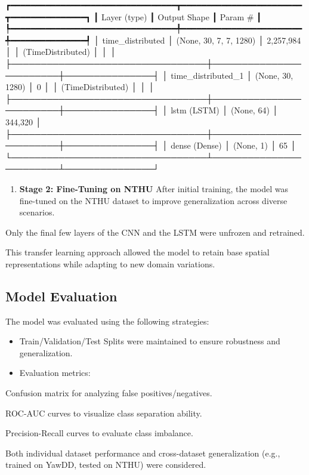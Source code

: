 \documentclass[
  letterpaper,
  DIV=11,
  numbers=noendperiod]{scrreport}
\providecommand{\tightlist}{%
  \setlength{\itemsep}{0pt}\setlength{\parskip}{0pt}}
\begin{document}
┏━━━━━━━━━━━━━━━━━━━━━━━━━━━━━━━━━┳━━━━━━━━━━━━━━━━━━━━━━━━┳━━━━━━━━━━━━━━━┓
┃ Layer (type) ┃ Output Shape ┃ Param \# ┃
┡━━━━━━━━━━━━━━━━━━━━━━━━━━━━━━━━━╇━━━━━━━━━━━━━━━━━━━━━━━━╇━━━━━━━━━━━━━━━┩
│ time\_distributed │ (None, 30, 7, 7, 1280) │ 2,257,984 │ │
(TimeDistributed) │ │ │
├─────────────────────────────────┼────────────────────────┼───────────────┤
│ time\_distributed\_1 │ (None, 30, 1280) │ 0 │ │ (TimeDistributed) │ │
│
├─────────────────────────────────┼────────────────────────┼───────────────┤
│ lstm (LSTM) │ (None, 64) │ 344,320 │
├─────────────────────────────────┼────────────────────────┼───────────────┤
│ dense (Dense) │ (None, 1) │ 65 │
└─────────────────────────────────┴────────────────────────┴───────────────┘

\begin{enumerate}
\def\labelenumi{\arabic{enumi}.}
\setcounter{enumi}{1}
\tightlist
\item
  \textbf{Stage 2: Fine-Tuning on NTHU} After initial training, the
  model was fine-tuned on the NTHU dataset to improve generalization
  across diverse scenarios.
\end{enumerate}

Only the final few layers of the CNN and the LSTM were unfrozen and
retrained.

This transfer learning approach allowed the model to retain base spatial
representations while adapting to new domain variations.

\subsection{Model Evaluation}\label{model-evaluation}

The model was evaluated using the following strategies:

\begin{itemize}
\item
  Train/Validation/Test Splits were maintained to ensure robustness and
  generalization.
\item
  Evaluation metrics:
\end{itemize}

Confusion matrix for analyzing false positives/negatives.

ROC-AUC curves to visualize class separation ability.

Precision-Recall curves to evaluate class imbalance.

Both individual dataset performance and cross-dataset generalization
(e.g., trained on YawDD, tested on NTHU) were considered.
\end{document}

